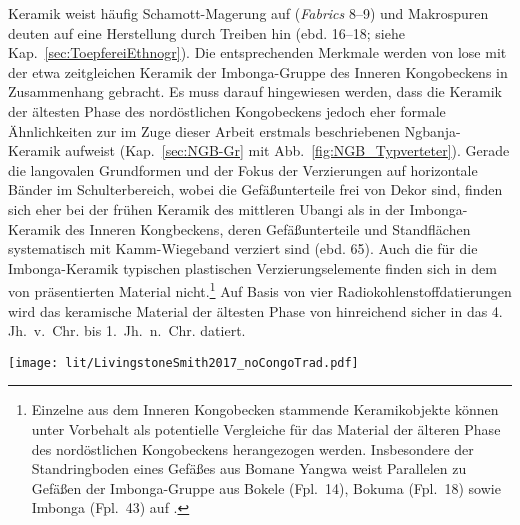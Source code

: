 Keramik weist häufig Schamott-Magerung auf (\textit{Fabrics} 8--9) und Makrospuren deuten auf eine Herstellung durch Treiben hin (ebd. 16--18; siehe Kap.~\ref{sec:ToepfereiEthnogr}). Die entsprechenden Merkmale werden von \textcite[16]{LivingstoneSmith.2017} lose mit der etwa zeitgleichen Keramik der Imbonga-Gruppe des Inneren Kongobeckens \parencite[59--68]{Wotzka.1995} in Zusammenhang gebracht. Es muss darauf hingewiesen werden, dass die Keramik der ältesten Phase des nordöstlichen Kongobeckens jedoch eher formale Ähnlichkeiten zur im Zuge dieser Arbeit erstmals beschriebenen Ngbanja-Keramik aufweist (Kap.~\ref{sec:NGB-Gr} mit Abb.~\ref{fig:NGB_Typverteter}). Gerade die langovalen Grundformen und der Fokus der Verzierungen auf horizontale Bänder im Schulterbereich, wobei die Gefäßunterteile frei von Dekor sind, finden sich eher bei der frühen Keramik des mittleren Ubangi als in der Imbonga-Keramik des Inneren Kongbeckens, deren Gefäßunterteile und Standflächen systematisch mit Kamm-Wiegeband verziert sind (ebd. 65). Auch die für die Imbonga-Keramik typischen plastischen Verzierungselemente finden sich in dem von \textcite[18 Abb.~24]{LivingstoneSmith.2017} präsentierten Material nicht.\footnote{Einzelne aus dem Inneren Kongobecken stammende Keramikobjekte können unter Vorbehalt als potentielle Vergleiche für das Material der älteren Phase des nordöstlichen Kongobeckens herangezogen werden. Insbesondere der Standringboden eines Gefäßes aus Bomane Yangwa \parencites[14 Abb.~3]{LivingstoneSmith.2011} weist Parallelen zu Gefäßen der Imbonga-Gruppe aus Bokele (Fpl.~14), Bokuma (Fpl.~18) sowie Imbonga (Fpl.~43) auf \parencite[453 Taf.~19.4, 6, 9, 470 Taf.~36.12, 471 Taf.~37.7, 490 Taf.~56.2]{Wotzka.1995}.} Auf Basis von vier Radiokohlenstoffdatierungen wird das keramische Material der ältesten Phase von \textcite[17 Abb.~23]{LivingstoneSmith.2017} hinreichend sicher in das 4. Jh.~v.~Chr. bis 1.~Jh.~n.~Chr. datiert.

\begin{figure*}[tb!]
	\centering
	\texttt{[image: lit/LivingstoneSmith2017\_noCongoTrad.pdf]}
	\caption{Nordöstliches Kongobecken: Regionale Sequenz nach \textcite{LivingstoneSmith.2017}.\\{\footnotesize 1--3: \textit{Ältere Phase} (\textit{cf}. Bomane Yangwa; ebd. 18 Abb. 2--4); 4--7: \textit{Mittlerer Phase} (\textit{cf}. Ilambi Moke; ebd. 19 Abb. 25.3, 25.1, 25.2, 25.8); 8--9: Ilambi-Gruppe (ebd. 19 Abb.~26.5, 26.1); 10--12: Yaekela-Gruppe (ebd. 20 Abb.~27.1, 27.6, 27.2); 13 Nkomba-Gruppe (ebd. 20 Abb.~28.1).}}
	\label{fig:LivingstoneSmith2017_noCongoTrad}
\end{figure*}

